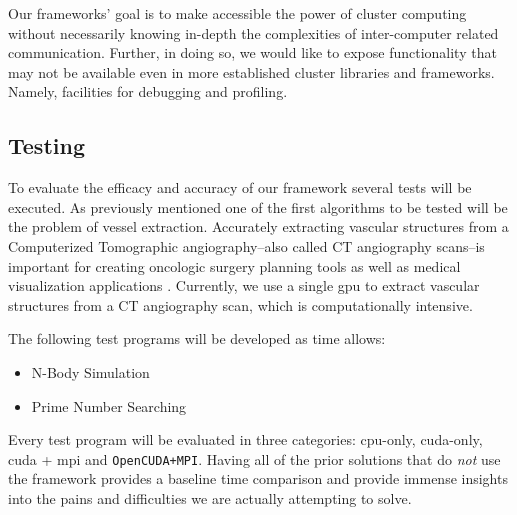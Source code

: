 Our frameworks' goal is to make accessible the power of \gls{cluster} computing
without necessarily knowing in-depth the complexities of inter-computer related
communication. Further, in doing so, we would like to expose functionality that
may not be available even in more established \gls{cluster} libraries and
frameworks. Namely, facilities for debugging and profiling.

\subsection{Testing}

To evaluate the efficacy and accuracy of our framework several tests will be
executed. As previously mentioned one of the first algorithms to be tested will
be the problem of vessel extraction. Accurately extracting vascular structures
from a Computerized Tomographic angiography--also called CT angiography
scans--is important for creating oncologic surgery planning tools as well as
medical visualization applications \cite{erdt2008automatic}.  Currently, we use
a single \gls{gpu} to extract vascular structures from a CT angiography scan,
which is computationally intensive.

The following test programs will be developed as time allows:

\begin{itemize}
    \item N-Body Simulation
    \item Prime Number Searching
\end{itemize}

Every test program will be evaluated in three categories: \gls{cpu}-only,
\gls{cuda}-only, \gls{cuda} + \gls{mpi} and \texttt{OpenCUDA+MPI}. Having all
of the prior solutions that do \emph{not} use the framework provides a baseline
time comparison and provide immense insights into the pains and difficulties we
are actually attempting to solve.
